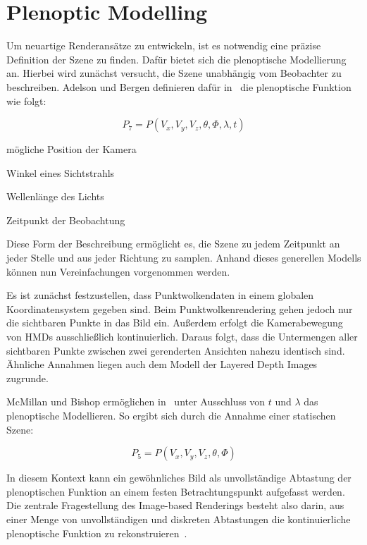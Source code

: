 \documentclass[hyperref, beleg, german, final, twoside]{cgvpub}
\begin{document}
\section{Plenoptic Modelling}

Um neuartige Renderansätze zu entwickeln, ist es notwendig eine präzise
Definition der Szene zu finden. Dafür bietet sich die plenoptische Modellierung
an. Hierbei wird zunächst versucht, die Szene unabhängig vom Beobachter zu
beschreiben. Adelson und Bergen definieren dafür in~\cite{adelson1991plenoptic}
die plenoptische Funktion wie folgt:

\begin{equation}
	P_7 = P(V_x, V_y, V_z, \theta, \Phi, \lambda, t)
\end{equation}

\begin{description}[style=sameline]
	\item[\( V_x, V_y, V_z \)] mögliche Position der Kamera
	\item[\( \theta, \Phi \)] Winkel eines Sichtstrahls
	\item[\( \lambda \)] Wellenlänge des Lichts
	\item[\( t \)] Zeitpunkt der Beobachtung
\end{description}

Diese Form der Beschreibung ermöglicht es, die Szene zu jedem Zeitpunkt an
jeder Stelle und aus jeder Richtung zu samplen. Anhand dieses generellen
Modells können nun Vereinfachungen vorgenommen werden.

Es ist zunächst festzustellen, dass Punktwolkendaten in einem globalen
Koordinatensystem gegeben sind. Beim Punktwolkenrendering gehen jedoch nur die
sichtbaren Punkte in das Bild ein. Außerdem erfolgt die Kamerabewegung von HMDs
ausschließlich kontinuierlich. Daraus folgt, dass die Untermengen aller
sichtbaren Punkte zwischen zwei gerenderten Ansichten nahezu identisch sind.
Ähnliche Annahmen liegen auch dem Modell der Layered Depth Images zugrunde.

McMillan und Bishop ermöglichen in~\cite{mcmillan1995plenoptic} unter
Ausschluss von \( t \) und \( \lambda \) das plenoptische Modellieren. So
ergibt sich durch die Annahme einer statischen Szene:

\begin{equation}
	P_5 = P(V_x, V_y, V_z, \theta, \Phi)
\end{equation}

In diesem Kontext kann ein gewöhnliches Bild als unvollständige Abtastung der
plenoptischen Funktion an einem festen Betrachtungspunkt aufgefasst werden. Die
zentrale Fragestellung des Image-based Renderings besteht also darin, aus einer
Menge von unvollständigen und diskreten Abtastungen die kontinuierliche
plenoptische Funktion zu rekonstruieren~\cite{mcmillan1995plenoptic}.
\end{document}
